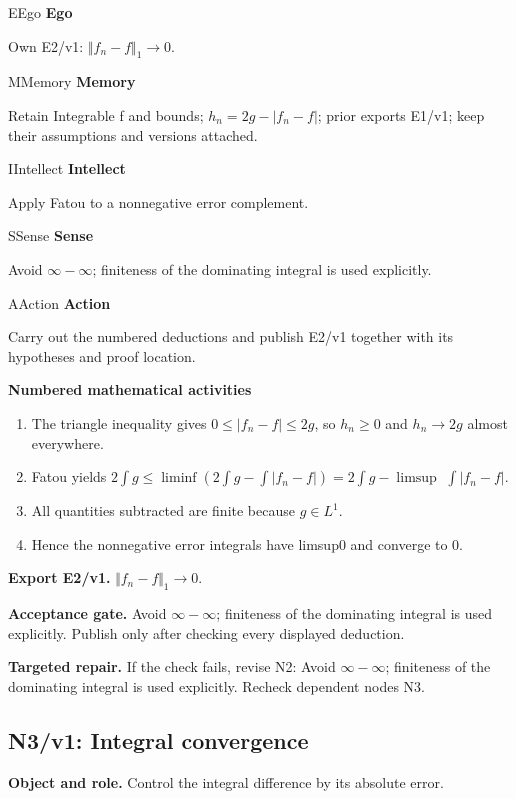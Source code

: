 \documentclass[preprint,12pt,aps,pra,showkeys,amsmath,amssymb,superscriptaddress,floatfix]{revtex4-2}
\theoremstyle{definition}
\theoremstyle{remark}
\newcommand{\mmfaculty}[3]{%
 \begin{mmfacultybox}{#1}{#2}
 {\sffamily\bfseries\color{MMBlue}#2}\par\smallskip #3
 \end{mmfacultybox}}
\newcommand{\field}[2]{\par\smallskip\noindent\textbf{#1.} #2\par}
\begin{document}
\mmfaculty{E}{Ego}{Own E2/v1: \(\Vert f_n-f\Vert _{1}\to 0\).}

\mmfaculty{M}{Memory}{Retain Integrable f and bounds; \(h_n=2g-|f_n-f|\); prior exports E1/v1;
keep their assumptions and versions attached.}

\mmfaculty{I}{Intellect}{Apply Fatou to a nonnegative error complement.}

\mmfaculty{S}{Sense}{Avoid \(\infty -\infty\); finiteness of the dominating integral is used
explicitly.}

\mmfaculty{A}{Action}{Carry out the numbered deductions and publish E2/v1 together with its
hypotheses and proof location.}

\smallskip\noindent\textbf{Numbered mathematical activities}

\begin{enumerate}[label=N2.\arabic*,leftmargin=3.4em]

\item The triangle inequality gives \(0\le |f_n-f|\le 2g\), so \(h_n\ge 0\)
and \(h_n\to 2g\) almost everywhere.

\item Fatou yields
\(2\int g\le \operatorname{liminf} (2\int g-\int |f_n-f|)=2\int g-\operatorname{limsup}\)
\(\int |f_n-f|\).

\item All quantities subtracted are finite because \(g\in L^{1}\).

\item Hence the nonnegative error integrals have limsup0 and converge to 0.

\end{enumerate}

\field{Export E2/v1}{\(\Vert f_n-f\Vert _{1}\to 0\).}

\field{Acceptance gate}{Avoid \(\infty -\infty\); finiteness of the dominating integral is used
explicitly. Publish only after checking every displayed deduction.}

\field{Targeted repair}{If the check fails, revise N2: Avoid \(\infty -\infty\); finiteness of
the dominating integral is used explicitly. Recheck dependent nodes N3.}

\clearpage

\subsection{N3/v1: Integral convergence}

\field{Object and role}{Control the integral difference by its absolute error.}
\end{document}
